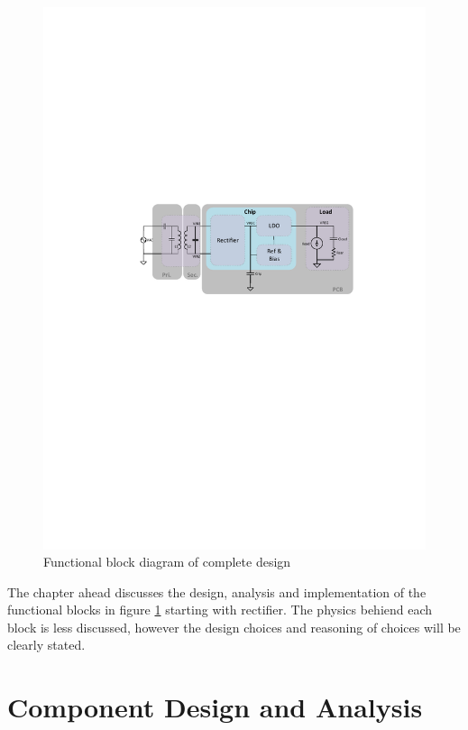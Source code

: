 \documentclass[UKenglish]{ifimaster}  %
\begin{document}
\begin{figure}[!htbp] %
   \centering
   \includegraphics[width=\textwidth]{img/visio_funct_wpt.pdf}
   \caption{Functional block diagram of complete design}
   \label{fig:funct_block}
\end{figure}

The chapter ahead discusses the design, analysis and implementation of the functional blocks in figure 
\ref{fig:funct_block} starting with rectifier. The physics behiend each block is less discussed, however the 
design choices and reasoning of choices will be clearly stated. 



\part{Component Design and Analysis}    
\end{document}
